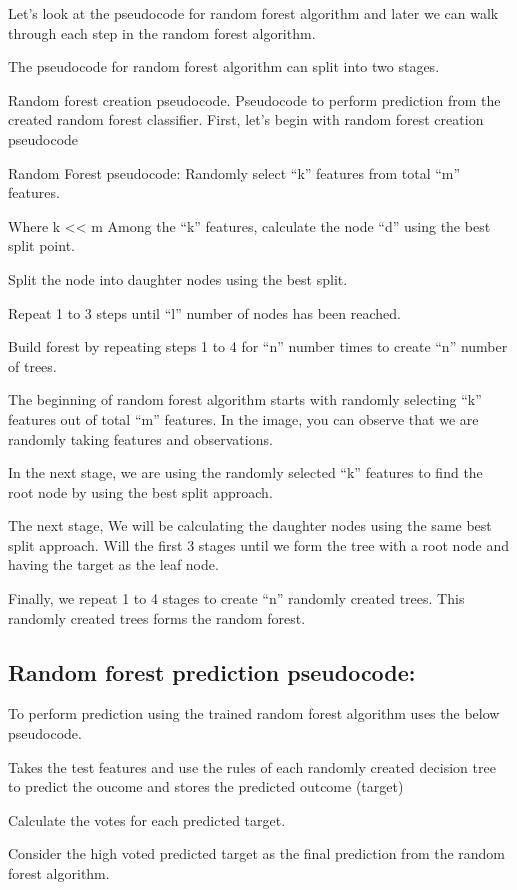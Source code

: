 \documentclass[a4paper,12pt]{article}
\begin{document}
Let’s look at the pseudocode for random forest algorithm and later we can walk through each step in the random forest algorithm.

The pseudocode for random forest algorithm can split into two stages.

Random forest creation pseudocode.
Pseudocode to perform prediction from the created random forest classifier.
First, let’s begin with random forest creation pseudocode

Random Forest pseudocode:
Randomly select “k” features from total “m” features.

Where k << m
Among the “k” features, calculate the node “d” using the best split point.

Split the node into daughter nodes using the best split.

Repeat 1 to 3 steps until “l” number of nodes has been reached.

Build forest by repeating steps 1 to 4 for “n” number times to create “n” number of trees.

The beginning of random forest algorithm starts with randomly selecting “k” features out of total “m” features. In the image, you can observe that we are randomly taking features and observations.

In the next stage, we are using the randomly selected “k” features to find the root node by using the best split approach.

The next stage, We will be calculating the daughter nodes using the same best split approach. Will the first 3 stages until we form the tree with a root node and having the target as the leaf node.

Finally, we repeat 1 to 4 stages to create “n” randomly created trees. This randomly created trees forms the random forest.

\subsection*{Random forest prediction pseudocode:}
To perform prediction using the trained random forest algorithm uses the below pseudocode.

Takes the test features and use the rules of each randomly created decision tree to predict the oucome and stores the predicted outcome (target)

Calculate the votes for each predicted target.

Consider the high voted predicted target as the final prediction from the random forest algorithm.
\end{document}
